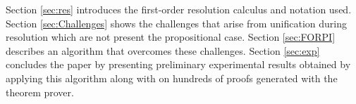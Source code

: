 \documentclass{llncs}
\begin{document}
Section \ref{sec:res} introduces the first-order resolution calculus and notation used. Section \ref{sec:Challenges} shows the challenges that arise from unification during resolution which are not present the propositional case. Section \ref{sec:FORPI} describes an algorithm that overcomes these challenges. Section \ref{sec:exp} concludes the paper by presenting preliminary experimental results obtained by applying this algorithm along with {\GFOLU} on hundreds of proofs generated with the {\SPASS} theorem prover. 







%

%
%








\begin{footnotesize}
%


\end{footnotesize}
\end{document}
